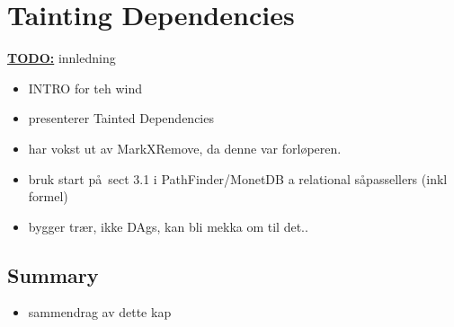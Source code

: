 \chapter{Tainting Dependencies}
\label{sect:translation}
\label{chapter:translation}
\textbf{\underline{\LARGE TODO:}} innledning
\begin{itemize}
  \item INTRO for teh wind
  \item presenterer Tainted Dependencies
  \item har vokst ut av MarkXRemove, da denne var forl\o peren.
  \item bruk start p\aa~sect 3.1 i  PathFinder/MonetDB a relational s\aa passellers (inkl formel)
  \item bygger tr\ae r, ikke DAgs, kan bli mekka om til det..
\end{itemize}














\section{Summary}
\label{sect:trans:summary}
\begin{itemize}
  \item sammendrag av dette kap
\end{itemize}